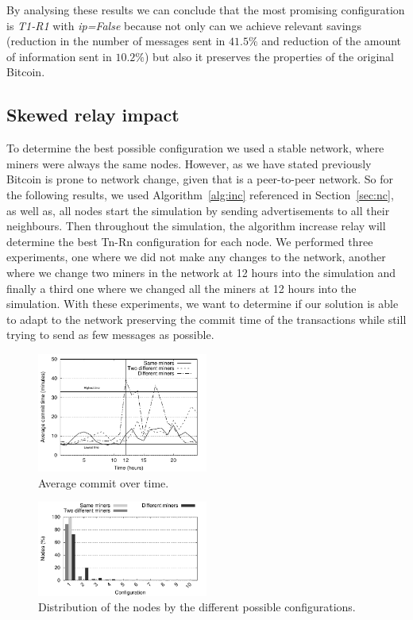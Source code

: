 \documentclass{dads}   %
\begin{document}
By analysing these results we can conclude that the most promising configuration is \textsl{T1-R1} with \textsl{ip=False} because not only can we achieve relevant savings (reduction in the number of messages sent in $41.5\%$ and reduction of the amount of information sent in $10.2\%$) but also it preserves the properties of the original Bitcoin.
\vspace{-1.5mm}
\subsection{Skewed relay impact}
To determine the best possible configuration we used a stable network, where miners were always the same nodes. However, as we have stated previously Bitcoin is prone to network change, given that is a peer-to-peer network. So for the following results, we used Algorithm~\ref{alg:inc} referenced in Section~\ref{sec:nc}, as well as, all nodes start the simulation by sending advertisements to all their neighbours. Then throughout the simulation, the algorithm increase relay will determine the best Tn-Rn configuration for each node. We performed three experiments, one where we did not make any changes to the network, another where we change two miners in the network at 12 hours into the simulation and finally a third one where we changed all the miners at 12 hours into the simulation. With these experiments, we want to determine if our solution is able to adapt to the network preserving the commit time of the transactions while still trying to send as few messages as possible.

\begin{figure}
\centering
\includegraphics[width=0.5\textwidth]{plots/commit_over_time.pdf}
\caption{Average commit over time.}
\label{fig:commit-over-time}
\end{figure}

\begin{figure}
\centering
\includegraphics[width=0.5\textwidth]{plots/nodes_per_config.pdf}
\caption{Distribution of the nodes by the different possible configurations.}
\label{fig:node-per-conf}
\end{figure}
\end{document}
